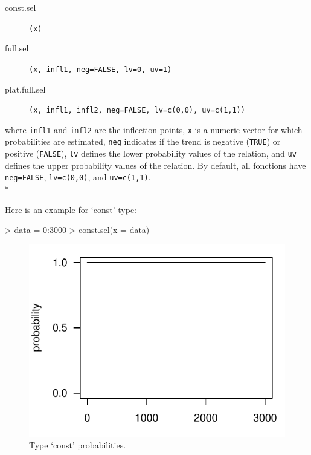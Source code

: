 \documentclass[letterpaper, 12pt]{article}
\begin{document}
\begin{description}
\item[const.sel]\verb#(x)#
\item[full.sel]\verb#(x, infl1, neg=FALSE, lv=0, uv=1)#
\item[plat.full.sel]\verb#(x, infl1, infl2, neg=FALSE, lv=c(0,0), uv=c(1,1))#
\end{description}
where \verb#infl1# and \verb#infl2# are the inflection points, \verb#x# is a numeric vector for which probabilities are 
estimated, \verb#neg# indicates if the trend is negative  (\verb#TRUE#) or positive (\verb#FALSE#), \verb#lv# defines the 
lower probability values of the relation, and \verb#uv# defines the upper probability values of the relation. By default, 
all fonctions have \verb#neg=FALSE#, \verb#lv=c(0,0)#, and \verb#uv=c(1,1)#.\\*

Here is an example for `const' type:


\begin{Schunk}
\begin{Sinput}
> data = 0:3000
> const.sel(x = data)
\end{Sinput}
\end{Schunk}

\begin{figure}[h]
\vspace{-20pt}
\begin{center}
\includegraphics{relation_sel-003}
\end{center}
  \vspace{-30pt}
  \caption{Type `const' probabilities.}
  \vspace{-10pt}
\label{fig1}
\end{figure}
\vspace*{\fill}
\end{document}
